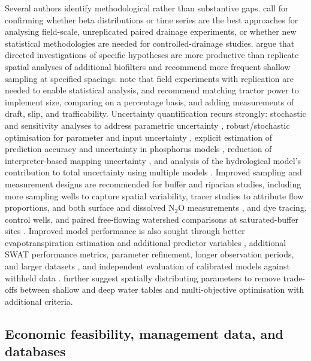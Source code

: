 Several authors identify methodological rather than substantive gaps.
\textcite{Pagliari2021} call for confirming whether beta distributions or time
series are the best approaches for analysing field-scale, unreplicated paired
drainage experiments, or whether new statistical methodologies are needed for
controlled-drainage studies. \textcite{Andrus2014} argue that directed
investigations of specific hypotheses are more productive than replicate spatial
analyses of additional biofilters and recommend more frequent shallow sampling at
specified spacings. \textcite{Okuda2020} note that field experiments with
replication are needed to enable statistical analysis, and \textcite{Wamono2016b}
recommend matching tractor power to implement size, comparing on a percentage
basis, and adding measurements of draft, slip, and trafficability. Uncertainty
quantification recurs strongly: stochastic and sensitivity analyses to address
parametric uncertainty \parencite{Gates2002,Burkhalter2006}, robust/stochastic
optimisation for parameter and input uncertainty \parencite{Lei2026}, explicit
estimation of prediction accuracy and uncertainty in phosphorus models
\parencite{Radcliffe2015}, reduction of interpreter-based mapping uncertainty
\parencite{Redoloza2023}, and analysis of the hydrological model's contribution to
total uncertainty using multiple models \parencite{Jeantet2022}. Improved sampling
and measurement designs are recommended for buffer and riparian studies, including
more sampling wells to capture spatial variability, tracer studies to attribute
flow proportions, and both surface and dissolved N$_2$O measurements
\parencite{Davis2019}, and dye tracing, control wells, and paired free-flowing
watershed comparisons at saturated-buffer sites \parencite{Jacquemin2020}. Improved
model performance is also sought through better evapotranspiration estimation and
additional predictor variables \parencite{Morrison2013}, additional SWAT performance
metrics, parameter refinement, longer observation periods, and larger datasets
\parencite{Zheng2025b}, and independent evaluation of calibrated models against
withheld data \parencite{Schoups2005}. \textcite{Schoups2005} further suggest
spatially distributing parameters to remove trade-offs between shallow and deep
water tables and multi-objective optimisation with additional criteria.

\subsection{Economic feasibility, management data, and databases}


